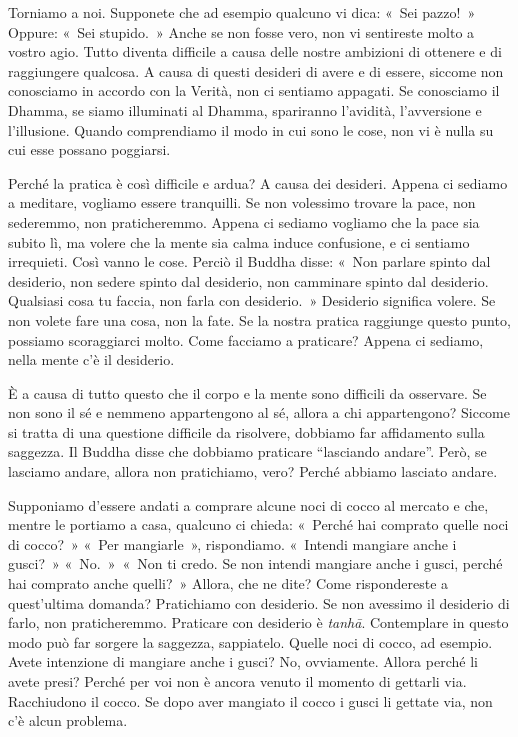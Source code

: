 Torniamo a noi. Supponete che ad esempio qualcuno vi dica: «~Sei
pazzo!~» Oppure: «~Sei stupido.~» Anche se non fosse vero, non vi
sentireste molto a vostro agio. Tutto diventa difficile a causa delle
nostre ambizioni di ottenere e di raggiungere qualcosa. A causa di
questi desideri di avere e di essere, siccome non conosciamo in accordo
con la Verità, non ci sentiamo appagati. Se conosciamo il Dhamma, se
siamo illuminati al Dhamma, spariranno l'avidità, l'avversione e
l'illusione. Quando comprendiamo il modo in cui sono le cose, non vi è
nulla su cui esse possano poggiarsi.

Perché la pratica è così difficile e ardua? A causa dei desideri. Appena
ci sediamo a meditare, vogliamo essere tranquilli. Se non volessimo
trovare la pace, non sederemmo, non praticheremmo. Appena ci sediamo
vogliamo che la pace sia subito lì, ma volere che la mente sia calma
induce confusione, e ci sentiamo irrequieti. Così vanno le cose. Perciò
il Buddha disse: «~Non parlare spinto dal desiderio, non sedere spinto
dal desiderio, non camminare spinto dal desiderio. Qualsiasi cosa tu
faccia, non farla con desiderio.~» Desiderio significa volere. Se non
volete fare una cosa, non la fate. Se la nostra pratica raggiunge questo
punto, possiamo scoraggiarci molto. Come facciamo a praticare? Appena ci
sediamo, nella mente c'è il desiderio.

È a causa di tutto questo che il corpo e la mente sono difficili da
osservare. Se non sono il sé e nemmeno appartengono al sé, allora a chi
appartengono? Siccome si tratta di una questione difficile da risolvere,
dobbiamo far affidamento sulla saggezza. Il Buddha disse che dobbiamo
praticare ``lasciando andare''. Però, se lasciamo andare, allora non
pratichiamo, vero? Perché abbiamo lasciato andare.

Supponiamo d'essere andati a comprare alcune noci di cocco al mercato e
che, mentre le portiamo a casa, qualcuno ci chieda: «~Perché hai
comprato quelle noci di cocco?~» «~Per mangiarle~», rispondiamo.
«~Intendi mangiare anche i gusci?~» «~No.~»~«~Non ti credo. Se non
intendi mangiare anche i gusci, perché hai comprato anche quelli?~»
Allora, che ne dite? Come rispondereste a quest'ultima domanda?
Pratichiamo con desiderio. Se non avessimo il desiderio di farlo, non
praticheremmo. Praticare con desiderio è \emph{tanhā}. Contemplare in
questo modo può far sorgere la saggezza, sappiatelo. Quelle noci di
cocco, ad esempio. Avete intenzione di mangiare anche i gusci? No,
ovviamente. Allora perché li avete presi? Perché per voi non è ancora
venuto il momento di gettarli via. Racchiudono il cocco. Se dopo aver
mangiato il cocco i gusci li gettate via, non c'è alcun problema.


